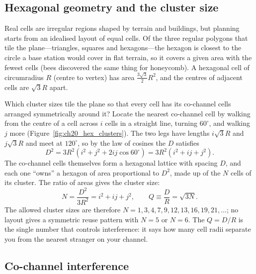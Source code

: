 \subsection{Hexagonal geometry and the cluster size}

Real cells are irregular regions shaped by terrain and buildings, but planning starts from an idealised
layout of equal cells. Of the three regular polygons that tile the plane---triangles, squares and
hexagons---the hexagon is closest to the circle a base station would cover in flat terrain, so it
covers a given area with the fewest cells (bees discovered the same thing for honeycomb). A hexagonal
cell of circumradius $R$ (centre to vertex) has area $\frac{3\sqrt3}{2}R^2$, and the centres of adjacent
cells are $\sqrt3R$ apart.

Which cluster sizes tile the plane so that every cell has its co-channel cells arranged symmetrically
around it? Locate the nearest co-channel cell by walking from the centre of a cell across $i$ cells
in a straight line, turning $60^\circ$, and walking $j$ more (Figure~\ref{fig:ch20_hex_clusters}). The
two legs have lengths $i\sqrt3R$ and $j\sqrt3R$ and meet at $120^\circ$, so by the law of cosines the
 $D$ satisfies
\begin{equation}
D^2=3R^2\left(i^2+j^2+2ij\cos60^\circ\right)=3R^2\left(i^2+ij+j^2\right).
\end{equation}
The co-channel cells themselves form a hexagonal lattice with spacing $D$, and each one ``owns'' a
hexagon of area proportional to $D^2$, made up of the $N$ cells of its cluster. The ratio of areas gives
the cluster size:
\begin{equation}
N=\frac{D^2}{3R^2}=i^2+ij+j^2,\qquad
Q\equiv\frac DR=\sqrt{3N}.
\label{eq:ch20:cluster}
\end{equation}
The allowed cluster sizes are therefore $N=1,3,4,7,9,12,13,16,19,21,\dots$; no layout gives a symmetric
reuse pattern with $N=5$ or $N=6$. The  $Q=D/R$ is the single number that
controls interference: it says how many cell radii separate you from the nearest stranger on your channel.

\subsection{Co-channel interference}

